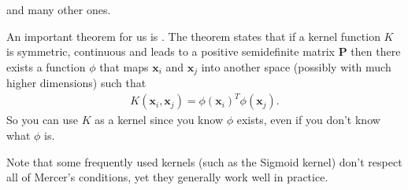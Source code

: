 \documentclass[letterpaper,10pt,english]{sphinxmanual}
\begin{document}
and many other ones.

An important theorem for us is .  The
theorem states that if a kernel function \(K\) is symmetric, continuous
and leads to a positive semi\sphinxhyphen{}definite matrix \(\boldsymbol{P}\) then there
exists a function \(\phi\) that maps \(\boldsymbol{x}_i\) and \(\boldsymbol{x}_j\) into
another space (possibly with much higher dimensions) such that
\begin{equation*}
\begin{split}
K(\boldsymbol{x}_i,\boldsymbol{x}_j)=\phi(\boldsymbol{x}_i)^T\phi(\boldsymbol{x}_j).
\end{split}
\end{equation*}
So you can use \(K\) as a kernel since you know \(\phi\) exists, even if
you don’t know what \(\phi\) is.

Note that some frequently used kernels (such as the Sigmoid kernel)
don’t respect all of Mercer’s conditions, yet they generally work well
in practice.
\end{document}
